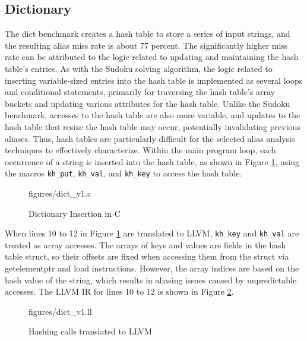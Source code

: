 \subsection{Dictionary}
The dict benchmark creates a hash table to store a series of input strings, and the resulting alias miss rate is about 77 percent. The significantly higher miss rate can be attributed to the logic related to updating and maintaining the hash table's entries. As with the Sudoku solving algorithm, the logic related to inserting variable-sized entries into the hash table is implemented as several loops and conditional statements, primarily for traversing the hash table's array buckets and updating various attributes for the hash table. Unlike the Sudoku benchmark, accesses to the hash table are also more variable, and updates to the hash table that resize the hash table may occur, potentially invalidating previous aliases. Thus, hash tables are particularly difficult for the selected alias analysis techniques to effectively characterize. Within the main program loop, each occurrence of a string is inserted into the hash table, as shown in Figure \ref{fig:dictc}, using the macros \texttt{kh\_put}, \texttt{kh\_val}, and \texttt{kh\_key} to access the hash table.

\begin{figure} [h!]
   {figures/dict_v1.c}
  \caption{Dictionary Insertion in C}
  \label{fig:dictc}
\end{figure}

When lines 10 to 12 in Figure \ref{fig:dictc} are translated to LLVM, \texttt{kh\_key} and \texttt{kh\_val} are treated as array accesses. The arrays of keys and values are fields in the hash table struct, so their offsets are fixed when accessing them from the struct via getelementptr and load instructions. However, the array indices are based on the hash value of the string, which results in aliasing issues caused by unpredictable accesses. The LLVM IR for lines 10 to 12 is shown in Figure \ref{fig:dictll}.

\begin{figure} [h!]
   {figures/dict_v1.ll}
  \caption{Hashing calls translated to LLVM}
  \label{fig:dictll}
\end{figure}


